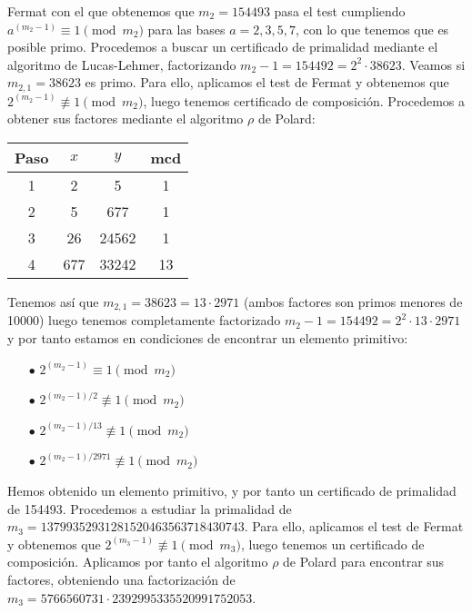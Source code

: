 \documentclass[fleqn]{article}
\begin{document}
    Fermat con el que obtenemos que $m_2 = 154493$ pasa el test cumpliendo $a^{(m_2 - 1)} \equiv 1 \pmod{m_2}$ para las bases $a = 2,3,5,7$, con lo que tenemos 
    que es posible primo. Procedemos a buscar un certificado de primalidad mediante el algoritmo de Lucas-Lehmer, factorizando $m_2 - 1 = 154492 = 2^2 \cdot 38623$.
    Veamos si $m_{2,1} = 38623$ es primo. Para ello, aplicamos el test de Fermat y obtenemos que $2^{(m_2 - 1)} \not\equiv 1 \pmod{m_2}$, luego tenemos certificado de
    composición. Procedemos a obtener sus factores mediante el algoritmo $\rho$ de Polard:  
    \begin{center}
        \begin{tabular}{| c | c | c | c |}
            \hline Paso & $x$ & $y$ & mcd \\ \hline
            1 & 2 & 5 & 1 \\
            2 & 5 & 677 & 1 \\
            3 & 26 & 24562 & 1 \\
            4 & 677 & 33242 & 13 \\ \hline
        \end{tabular}
    \end{center}

    Tenemos así que $m_{2,1} = 38623 = 13 \cdot 2971$ (ambos factores son primos menores de 10000) luego tenemos completamente factorizado 
    $m_2 - 1 = 154492 = 2^2 \cdot 13 \cdot 2971$ y por tanto estamos en condiciones de encontrar un elemento primitivo:
    \begin{enumerate}
        \item[$\bullet$] $2^{(m_2 - 1)} \equiv 1 \pmod{m_2}$
        \item[$\bullet$] $2^{(m_2 - 1)/2} \not\equiv 1 \pmod{m_2}$    
        \item[$\bullet$] $2^{(m_2 - 1)/13} \not\equiv 1 \pmod{m_2}$
        \item[$\bullet$] $2^{(m_2 - 1)/2971} \not\equiv 1 \pmod{m_2}$
    \end{enumerate}
    Hemos obtenido un elemento primitivo, y por tanto un certificado de primalidad de 154493. Procedemos a estudiar la primalidad de 
    $m_3 = 13799352931281520463563718430743$. Para ello, aplicamos el test de Fermat y obtenemos que $2^{(m_3 - 1)} \not\equiv 1 \pmod{m_3}$, luego tenemos
    un certificado de composición. Aplicamos por tanto el algoritmo $\rho$ de Polard para encontrar sus factores, obteniendo
    una factorización de $m_3 = 5766560731 \cdot 2392995335520991752053$. 
    
\end{document}
